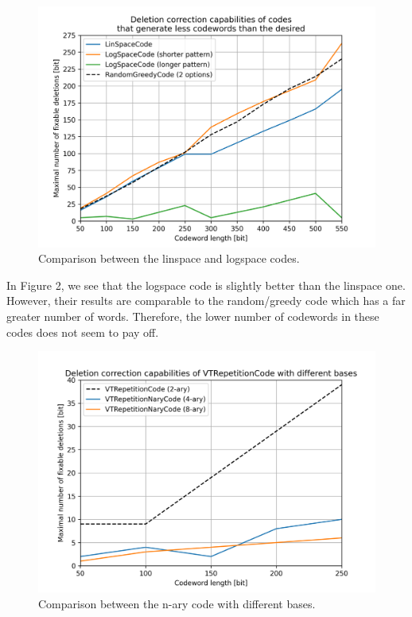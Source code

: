 \documentclass{article}
\begin{document}
\begin{figure}[H]
    \centering
    \includegraphics[width=1\textwidth]{../artifacts/figure2.png}
    \caption{Comparison between the linspace and logspace codes.}
\end{figure}

\noindent In Figure 2, we see that the logspace code is slightly better than the linspace one. However, their results are comparable to the random/greedy code which has a far greater number of words. Therefore, the lower number of codewords in these codes does not seem to pay off.

\begin{figure}[H]
    \centering
    \includegraphics[width=1\textwidth]{../artifacts/figure3.png}
    \caption{Comparison between the n-ary code with different bases.}
\end{figure}
\end{document}
